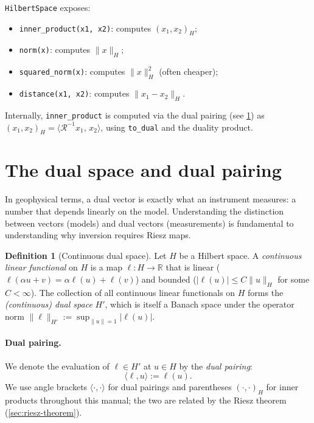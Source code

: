 \documentclass[11pt,twoside,openright]{book}
\theoremstyle{plain}
\theoremstyle{definition}
\newtheorem{definition}[theorem]{Definition}
\theoremstyle{remark}
\begin{document}
\begin{codebox}
\texttt{HilbertSpace} exposes:
\begin{itemize}
  \item \texttt{inner\_product(x1, x2)}: computes $(x_1, x_2)_H$;
  \item \texttt{norm(x)}: computes $\|x\|_H$;
  \item \texttt{squared\_norm(x)}: computes $\|x\|^2_H$ (often cheaper);
  \item \texttt{distance(x1, x2)}: computes $\|x_1 - x_2\|_H$.
\end{itemize}
Internally, \texttt{inner\_product} is computed via the dual pairing
(see \cref{sec:dual-space}) as $(x_1, x_2)_H = \langle \mathcal{R}^{-1} x_1,\, x_2\rangle$,
using \texttt{to\_dual} and the duality product.
\end{codebox}

\section{The dual space and dual pairing}
\label{sec:dual-space}

\begin{whybox}
In geophysical terms, a dual vector is exactly what an instrument
measures: a number that depends linearly on the model. Understanding the
distinction between vectors (models) and dual vectors (measurements) is
fundamental to understanding why inversion requires Riesz maps.
\end{whybox}

\begin{definition}[Continuous dual space]
\label{def:dual-space}
Let $H$ be a Hilbert space. A \emph{continuous linear functional} on $H$
is a map $\ell : H \to \mathbb{R}$ that is linear ($\ell(\alpha u + v) =
\alpha \ell(u) + \ell(v)$) and bounded ($|\ell(u)| \leq C\|u\|_H$ for
some $C < \infty$). The collection of all continuous linear functionals
on $H$ forms the \emph{(continuous) dual space} $H'$, which is itself a
Banach space under the operator norm $\|\ell\|_{H'} := \sup_{\|u\|=1}
|\ell(u)|$.
\end{definition}

\paragraph{Dual pairing.}
We denote the evaluation of $\ell \in H'$ at $u \in H$ by the \emph{dual
pairing}:
\begin{equation}
  \label{eq:dual-pairing}
  \langle \ell, u \rangle := \ell(u).
\end{equation}
We use angle brackets $\langle\cdot,\cdot\rangle$ for dual pairings and
parentheses $(\cdot,\cdot)_H$ for inner products throughout this manual;
the two are related by the Riesz theorem (\cref{sec:riesz-theorem}).
\end{document}
